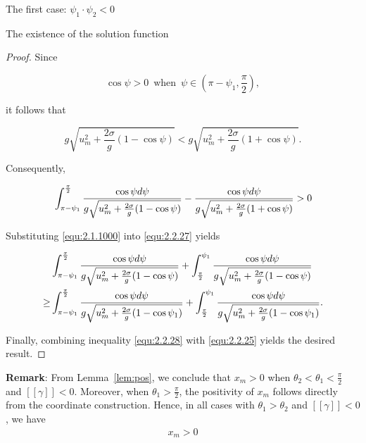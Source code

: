\documentclass[letterpaper,reqno,10pt,twoside]{amsart}
\theoremstyle{definition}
\theoremstyle{remark}
\begin{document}
\begin{section}{The first case: $\psi_1\cdot \psi_2<0$ }
\begin{subsection}{The existence of the solution function}
\begin{proof}
        Since

        \begin{equation*}
            \cos\psi>0~\operatorname{when}~\psi\in(\pi-\psi_1,\frac{\pi}{2}),
        \end{equation*}

       \noindent it follows that

        \begin{equation*}
            g\sqrt{u_{m}^{2}+\frac{2\sigma}{g}(1-\cos\psi)}<g\sqrt{u_{m}^{2}+\frac{2\sigma}{g}(1+\cos\psi)}.
        \end{equation*}

        \noindent Consequently,
        
        \begin{equation}{\label{equ:2.1.1000}}
            \int_{\pi-\psi_1}^{\frac{\pi}{2}} \frac{\cos\psi d\psi}{g\sqrt{u_{m}^{2}+\frac{2\sigma}{g}(1-\cos\psi)}}-\frac{\cos\psi d\psi}{g\sqrt{u_{m}^{2}+\frac{2\sigma}{g}(1+\cos\psi)}}>0
        \end{equation}

        \noindent Substituting \eqref{equ:2.1.1000} into \eqref{equ:2.2.27} yields

        \begin{align}{\label{equ:2.2.28}}
        \begin{aligned}
             &\int_{\pi-\psi_1}^{\frac{\pi}{2}} \frac{\cos\psi d\psi}{g\sqrt{u_{m}^{2}+\frac{2\sigma}{g}(1-\cos\psi)}}+\int_{\frac{\pi}{2}}^{\psi_1} \frac{\cos\psi d\psi}{g\sqrt{u_{m}^{2}+\frac{2\sigma}{g}(1-\cos\psi)}}\\
              \geq& \int_{\pi-\psi_1}^{\frac{\pi}{2}} \frac{\cos\psi d\psi}{g\sqrt{u_{m}^{2}+\frac{2\sigma}{g}(1-\cos\psi_1)}}+\int_{\frac{\pi}{2}}^{\psi_1} \frac{\cos\psi d\psi}{g\sqrt{u_{m}^{2}+\frac{2\sigma}{g}(1-\cos\psi_1)}}.
        \end{aligned}
        \end{align}

       Finally, combining inequality \eqref{equ:2.2.28} with \eqref{equ:2.2.25} yields the desired result.
    \end{proof}
    
    \textbf{Remark}: From Lemma~\ref{lem:pos}, we conclude that $x_{m}>0$ when $\theta_{2}<\theta_{1}<\frac{\pi}{2}$ and $[\![\gamma]\!]<0$. Moreover, when $\theta_{1}>\frac{\pi}{2}$, the positivity of $x_{m}$ follows directly from the coordinate construction. Hence, in all cases with $\theta_{1}>\theta_{2}$ and $[\![\gamma]\!]<0$, we have
    \begin{align}
        x_{m}>0
    \end{align}
    

\end{subsection}
\end{section}
\end{document}
